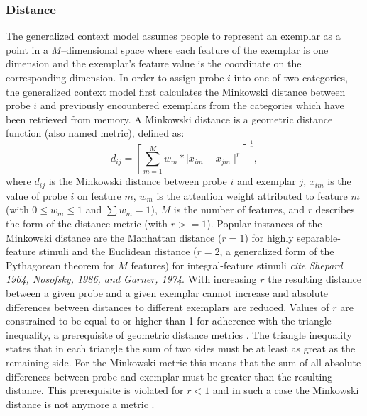\documentclass[a4paper,man,natbib]{apa6}
\begin{document}
\subsubsection{Distance}
The generalized context model \citep{nosofsky1984choice,nosofsky1986attention} assumes people to represent an exemplar as a point in a $M$--dimensional space where each feature of the exemplar is one dimension and the exemplar's feature value is the coordinate on the corresponding dimension. In order to assign probe $i$ into one of two categories, the generalized context model first calculates the Minkowski distance between probe $i$ and previously encountered exemplars from the categories which have been retrieved from memory. A Minkowski distance is a geometric distance function (also named metric), defined as: 
\begin{equation}
d_{ij} = \left[\sum\limits_{m=1}^M w_{m}*\mid x_{im} - x_{jm}\mid ^r\right]^\frac{1}{r},
\end{equation}
where $d_{ij}$ is the Minkowski distance between probe $i$ and exemplar $j$, $x_{im}$ is the value of probe $i$ on feature $m$, $w_{m}$ is the attention weight attributed to feature $m$ (with $0 \leq w_{m} \leq 1$ and $\sum w_{m} = 1$), $M$ is the number of features, and $r$ describes the form of the distance metric (with $r >= 1$). Popular instances of the Minkowski distance are the Manhattan distance ($r = 1$) for highly separable-feature stimuli and the Euclidean distance ($r = 2$, a generalized form of the Pythagorean theorem for $M$ features) for integral-feature stimuli \textit{cite Shepard 1964, Nosofsky, 1986, and Garner, 1974}. With increasing $r$ the resulting distance between a given probe and a given exemplar cannot increase and absolute differences between distances to different exemplars are reduced. Values of $r$ are constrained to be equal to or higher than 1 for adherence with the triangle inequality, a prerequisite of geometric distance metrics \citep{jakel2008similarity,francois2007concentration,tversky1982similarity,beals1968foundations}. The triangle inequality states that in each triangle the sum of two sides must be at least as great as the remaining side. For the Minkowski metric this means that the sum of all absolute differences between probe and exemplar must be greater than the resulting distance. This prerequisite is violated for $r < 1$ and in such a case the Minkowski distance is not anymore a metric \citep[][p. 5]{kress1989linear}. 

\end{document}
